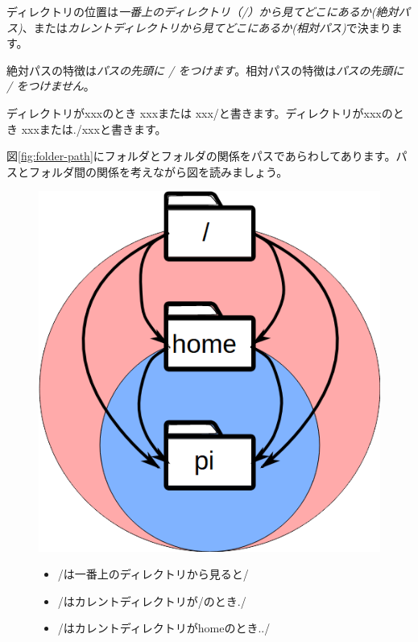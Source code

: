 ディレクトリの位置は\emph{一番上のディレクトリ（/）から見てどこにあるか(絶対パス)}、または\emph{カレントディレクトリから見てどこにあるか(相対パス)}で決まります。

絶対パスの特徴は\emph{パスの先頭に / をつけます}。相対パスの特徴は\emph{パスの先頭に / をつけません}。

ディレクトリがxxxのとき xxxまたは xxx/と書きます。ディレクトリがxxxのとき xxxまたは./xxxと書きます。

図\ref{fig:folder-path}にフォルダとフォルダの関係をパスであらわしてあります。パスとフォルダ間の関係を考えながら図を読みましょう。

\begin{figure}[H]
    \begin{minipage}{0.4\hsize}
        \includegraphics[width=\hsize]{images/chap03/text03-img004.png}
    \end{minipage}
    \begin{minipage}{0.6\hsize}
        \begin{itemize}
        \item /は一番上のディレクトリから見ると/
        \item /はカレントディレクトリが/のとき./
        \item /はカレントディレクトリがhomeのとき../

\end{itemize}
\end{minipage}
\end{figure}
